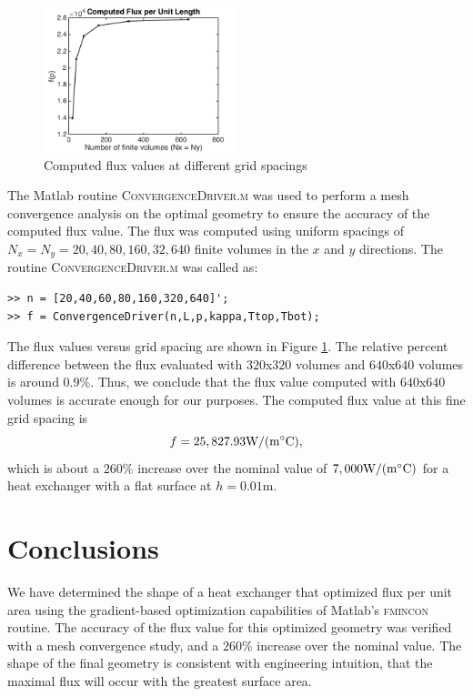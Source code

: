 \documentclass[11pt]{article}
\begin{document}
\begin{figure}[hbt]
\centering
\includegraphics[width=0.5\textwidth]{flux}
\caption{Computed flux values at different grid spacings}
\label{fig:flux}
\end{figure}

The Matlab routine \textsc{ConvergenceDriver.m} was used to
perform a mesh convergence analysis on the optimal geometry
to ensure the accuracy of the computed flux value. The flux
was computed using uniform spacings of $N_x = N_y = {20,40,80,160,32,640}$
finite volumes in the $x$ and $y$ directions. The routine
\textsc{ConvergenceDriver.m} was called as:
\begin{verbatim}
>> n = [20,40,60,80,160,320,640]';
>> f = ConvergenceDriver(n,L,p,kappa,Ttop,Tbot);
\end{verbatim}
The flux values versus grid spacing are shown in Figure
\ref{fig:flux}. The relative percent difference between the flux
evaluated with $320$x$320$ volumes and $640$x$640$ volumes
is around $0.9\%$. Thus, we conclude that the flux value computed
with $640$x$640$ volumes is accurate enough for our purposes.
The computed flux value at this fine grid spacing is
\begin{equation}
f = 25,827.93 \text{W}/(\text{m} \degree \text{C}),
\end{equation}
which is about a $260\%$ increase over the nominal value
of $7,000 \text{W}/(\text{m} \degree \text{C})$
for a heat exchanger with a flat surface at $h = 0.01$m.

\section{Conclusions}

We have determined the shape of a heat exchanger
that optimized flux per unit area using the gradient-based
optimization capabilities of Matlab's \textsc{fmincon} routine.
The accuracy of the flux value for this optimized geometry was verified
with a mesh convergence study, and a $260\%$ increase over the nominal
value. The shape of the final geometry is consistent with engineering
intuition, that the maximal flux will occur with the greatest
surface area.
\end{document}

